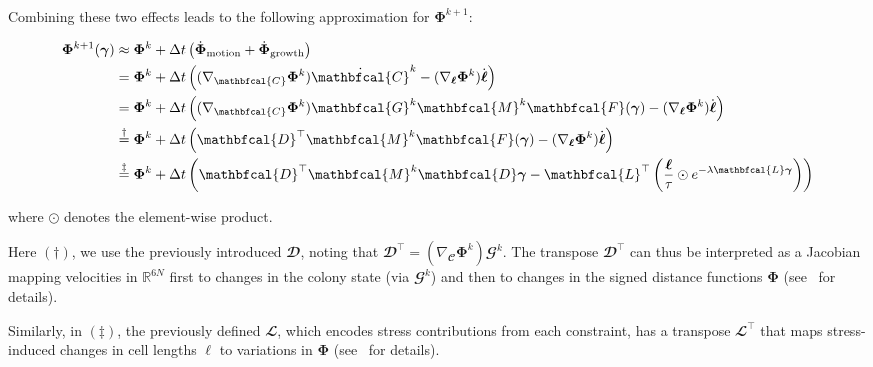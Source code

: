 \documentclass[conference]{IEEEtran}
\begin{document}
\noindent Combining these two effects leads to the following approximation for $\mathbf{\Phi}^{k+1}$:

\begin{equation}\label{eq:phi_expanded}
    \small
    \begin{split}
        \mathbf{\Phi}^{k+1}(\boldsymbol{\gamma}) & \approx \mathbf{\Phi}^k + \Delta t \left( \dot{\mathbf{\Phi}}_{\text{motion}} + \dot{\mathbf{\Phi}}_{\text{growth}} \right)\\
        & = \mathbf{\Phi}^k + \Delta t \left( (\nabla_{\mathbfcal{C}} \mathbf{\Phi}^k) \dot{\mathbfcal{C}}^k - (\nabla_{\boldsymbol{\ell}} \mathbf{\Phi}^k) \dot{\boldsymbol{\ell}} \right)\\
        & = \mathbf{\Phi}^k + \Delta t \left( (\nabla_{\mathbfcal{C}} \mathbf{\Phi}^k) \mathbfcal{G}^k \mathbfcal{M}^k  \mathbfcal{F}(\boldsymbol{\gamma}) - (\nabla_{\boldsymbol{\ell}} \mathbf{\Phi}^k) \dot{\boldsymbol{\ell}} \right)\\
        & \overset{\dagger}{=}
        \mathbf{\Phi}^k + \Delta t \left( \mathbfcal{D}^\top \mathbfcal{M}^k  \mathbfcal{F}(\boldsymbol{\gamma})
        - (\nabla_{\boldsymbol{\ell}} \mathbf{\Phi}^k) \dot{\boldsymbol{\ell}} \right)\\
        & \overset{\ddagger}{=} \mathbf{\Phi}^k + \Delta t \left( \mathbfcal{D}^\top \mathbfcal{M}^k \mathbfcal{D} \boldsymbol{\gamma} - \mathbfcal{L}^\top \left(\frac{\boldsymbol{\ell}}{\tau} \odot e^{-\lambda \mathbfcal{L} \boldsymbol{\gamma}} \right)\right)
    \end{split}
\end{equation}

\noindent where $\odot$ denotes the element-wise product.

Here $(\dagger)$, we use the previously introduced $\mathbfcal{D}$, noting that $\mathbfcal{D}^\top = (\nabla_{\mathbfcal{C}} \mathbf{\Phi}^k) \mathbfcal{G}^k$. The transpose $\mathbfcal{D}^\top$ can thus be interpreted as a Jacobian mapping velocities in $\mathbb{R}^{6N}$ first to changes in the colony state (via $\mathbfcal{G}^k$) and then to changes in the signed distance functions $\mathbf{\Phi}$ (see~\cite{Weady2024SM, Tasora2008} for details).

Similarly, in $(\ddagger)$, the previously defined $\mathbfcal{L}$, which encodes stress contributions from each constraint, has a transpose $\mathbfcal{L}^\top$ that maps stress-induced changes in cell lengths $\boldsymbol{\ell}$ to variations in $\mathbf{\Phi}$ (see~\cite{Weady2024SM} for details).
\end{document}
